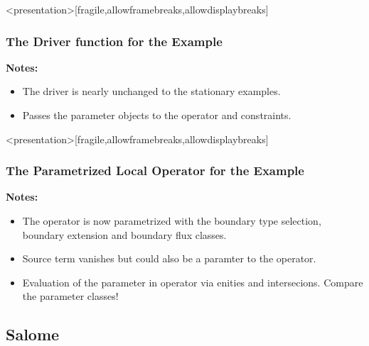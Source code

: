 \begin{frame}<presentation>[fragile,allowframebreaks,allowdisplaybreaks]
  \frametitle<presentation>{The Driver function for the Example}
  
  \textbf{Notes:}
  \begin{itemize}
    \item The driver is nearly unchanged to the stationary examples.
    \item Passes the parameter objects to the operator and constraints.
  \end{itemize}
\end{frame}

\begin{frame}<presentation>[fragile,allowframebreaks,allowdisplaybreaks]
  \frametitle<presentation>{The Parametrized Local Operator for the Example}
  
  \textbf{Notes:}
  \begin{itemize}
    \item The operator is now parametrized with the boundary type selection,
      boundary extension and boundary flux classes.
    \item Source term vanishes but could also be a paramter to the operator.
    \item Evaluation of the parameter in operator via enities and intersecions.
      Compare the parameter classes!
  \end{itemize}
\end{frame}

\subsection{Salome}

